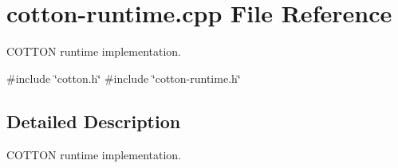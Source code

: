 \hypertarget{cotton-runtime_8cpp}{}\section{cotton-\/runtime.cpp File Reference}
\label{cotton-runtime_8cpp}


C\+O\+T\+T\+ON runtime implementation.  


{\ttfamily \#include \char`\"{}cotton.\+h\char`\"{}}\newline
{\ttfamily \#include \char`\"{}cotton-\/runtime.\+h\char`\"{}}\newline


\subsection{Detailed Description}
C\+O\+T\+T\+ON runtime implementation. 

